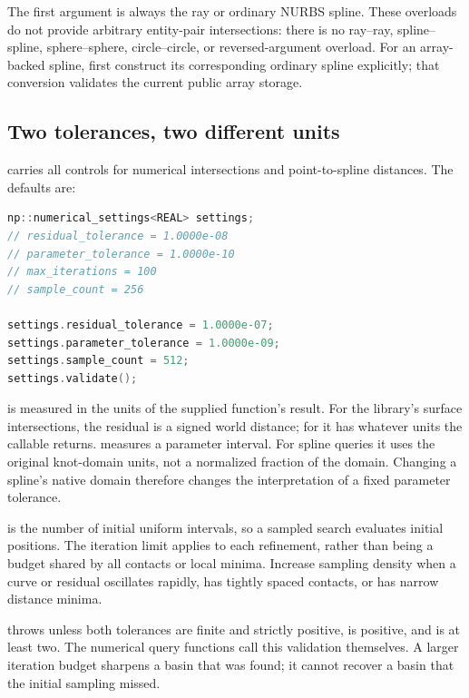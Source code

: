 The first argument is always the ray or ordinary NURBS spline. These overloads
do not provide arbitrary entity-pair intersections: there is no ray--ray,
spline--spline, sphere--sphere, circle--circle, or reversed-argument overload.
For an array-backed spline, first construct its corresponding ordinary spline
explicitly; that conversion validates the current public array storage.

\subsection{Two tolerances, two different units}

 carries all controls for numerical
intersections and point-to-spline distances. The defaults are:
\par\noindent\begin{minipage}{\linewidth}
\begin{lstlisting}[language=C++]
np::numerical_settings<REAL> settings;
// residual_tolerance = 1.0000e-08
// parameter_tolerance = 1.0000e-10
// max_iterations = 100
// sample_count = 256

settings.residual_tolerance = 1.0000e-07;
settings.parameter_tolerance = 1.0000e-09;
settings.sample_count = 512;
settings.validate();
\end{lstlisting}
\end{minipage}\par
{} is measured in the units of the supplied function's
result. For the library's surface intersections, the residual is a signed
world distance; for  it has whatever units the callable returns.
 measures a parameter interval. For spline queries it
uses the original knot-domain units, not a normalized fraction of the domain.
Changing a spline's native domain therefore changes the interpretation of a
fixed parameter tolerance.

 is the number of initial uniform intervals, so a sampled
search evaluates  initial positions. The iteration limit
applies to each refinement, rather than being a budget shared by all contacts
or local minima. Increase sampling density when a curve or residual oscillates
rapidly, has tightly spaced contacts, or has narrow distance minima.

 throws  unless both tolerances are
finite and strictly positive,  is positive, and
 is at least two. The numerical query functions call this
validation themselves. A larger iteration budget sharpens a basin that was
found; it cannot recover a basin that the initial sampling missed.

